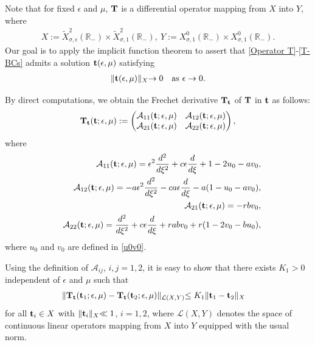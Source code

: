 \documentclass[11pt,a4paper]{article}
\numberwithin{equation}{section}
\numberwithin{figure}{section}
\newcommand\bt{{\bf t}}
\newcommand\bT{{\bf T}}
\newcommand\ep{\epsilon}
\newcommand\bea{\begin{eqnarray}}
\newcommand\eea{\end{eqnarray}}
\newcommand\beaa{\begin{eqnarray*}}
\newcommand\eeaa{\end{eqnarray*}}
\begin{document}
Note that for fixed $\ep$ and $\mu$, $\bT$ is a differential operator mapping from $X$ into $Y$,
where
\beaa
X:=\widetilde{X}^2_{\sigma,\epsilon}(\mathbb{R}_-)\times \widetilde{X}^2_{\sigma,1}(\mathbb{R}_-),\ Y:=X^0_{\sigma,1}(\mathbb{R}_-)\times X^0_{\sigma,1}(\mathbb{R}_-).
\eeaa
Our goal is to apply the implicit function theorem to assert that \eqref{Operator T}-\eqref{T-BCs} admits a solution
$\bt(\ep,\mu)$ satisfying
\beaa
\lVert\bt(\ep,\mu)\lVert_{X}\to0\quad \mbox{as $\ep\to0$}.
\eeaa



By direct computations, we obtain the Frechet derivative $\bT_{\bt}$  of $\bT$ in ${\bt}$ as follows:
\beaa
\bT_{\bt}(\bt;\epsilon,\mu):=
 \begin{pmatrix}
 \mathcal{A}_{11}(\bt;\epsilon,\mu) &  \mathcal{A}_{12}(\bt;\epsilon,\mu)\\
   \mathcal{A}_{21}(\bt;\epsilon,\mu) &  \mathcal{A}_{22}(\bt;\epsilon,\mu)
 \end{pmatrix},
\eeaa
where
\beaa
 &&\mathcal{A}_{11}(\bt;\epsilon,\mu)=\ep^2\frac{d^2}{d \xi^2}+c\ep \frac{d}{d \xi}+1-2u_0-av_0,\\
 && \mathcal{A}_{12}(\bt;\epsilon,\mu)=-a\ep^2\frac{d^2}{d \xi^2}-ca\ep \frac{d}{d \xi}-a(1-u_0-av_0),\\
 &&\mathcal{A}_{21}(\bt;\epsilon,\mu)=-rbv_0,\\
 &&  \mathcal{A}_{22}(\bt;\epsilon,\mu)=\frac{d^2}{d \xi^2}+c\ep \frac{d}{d \xi}+rabv_0+r(1-2v_0-bu_0),
\eeaa
where $u_0$ and $v_0$ are defined in \eqref{u0v0}.

Using the definition of $\mathcal{A}_{ij}$, $i,j=1,2$, it is easy to show that there exists $K_1>0$ independent of $\epsilon$ and $\mu$ such that
\bea\label{modulus-of-continuity}
\lVert  \bT_{\bt}(\bt_1;\epsilon,\mu)-\bT_{\bt}(\bt_2;\epsilon,\mu)\lVert_{\mathcal{L}(X,Y)}\leq K_1 \lVert \bt_1-\bt_2 \lVert_{X}\quad
\eea
for all $\bt_i\in X$ with $\lVert \bt_i\lVert_{X}\ll1$, $i=1,2$, where $\mathcal{L}(X,Y)$ denotes the space of
continuous linear operators mapping from $X$ into $Y$ equipped with
the usual norm.
\end{document}
